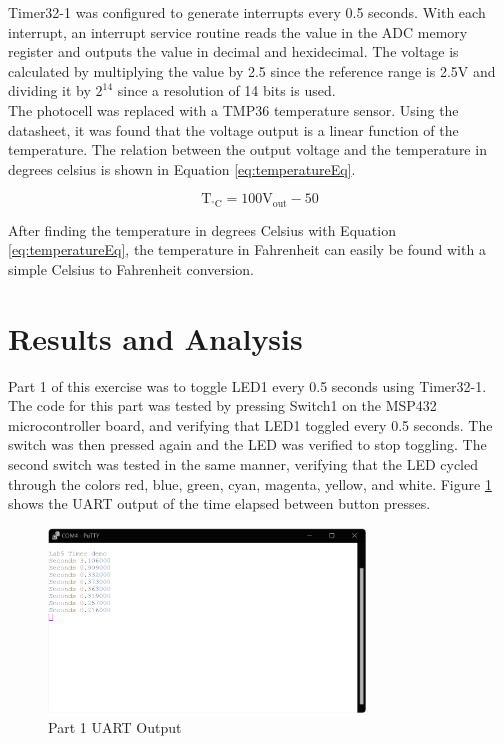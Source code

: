 \documentclass[CMPE]{KGCOEReport}
\begin{document}
Timer32-1 was configured to generate interrupts every 0.5 seconds. With each interrupt, an interrupt service routine reads the value in the ADC memory register and outputs the value in decimal and hexidecimal. The voltage is calculated by multiplying the value by 2.5 since the reference range is 2.5V and dividing it by $2^{14}$ since a resolution of 14 bits is used. \\

The photocell was replaced with a TMP36 temperature sensor. Using the datasheet, it was found that the voltage output is a linear function of the temperature. The relation between the output voltage and the temperature in degrees celsius is shown in Equation \ref{eq:temperatureEq}.

\begin{equation}
\text{T}_{^\circ\text{C}} = 100\text{V}_\text{out} - 50
\label{eq:temperatureEq}
\end{equation}

After finding the temperature in degrees Celsius with Equation \ref{eq:temperatureEq}, the temperature in Fahrenheit can easily be found with a simple Celsius to Fahrenheit conversion.

\section*{Results and Analysis}

Part 1 of this exercise was to toggle LED1 every 0.5 seconds using Timer32-1. The code for this part was tested by pressing Switch1 on the MSP432 microcontroller board, and verifying that LED1 toggled every 0.5 seconds. The switch was then pressed again and the LED was verified to stop toggling. The second switch was tested in the same manner, verifying that the LED cycled through the colors red, blue, green, cyan, magenta, yellow, and white. Figure \ref{fig:part1} shows the UART output of the time elapsed between button presses.

\begin{figure}[H]
    \centering
    \includegraphics[width=0.75\textwidth]{part1.png}
    \caption{Part 1 UART Output}
    \label{fig:part1}
\end{figure}
\end{document}
